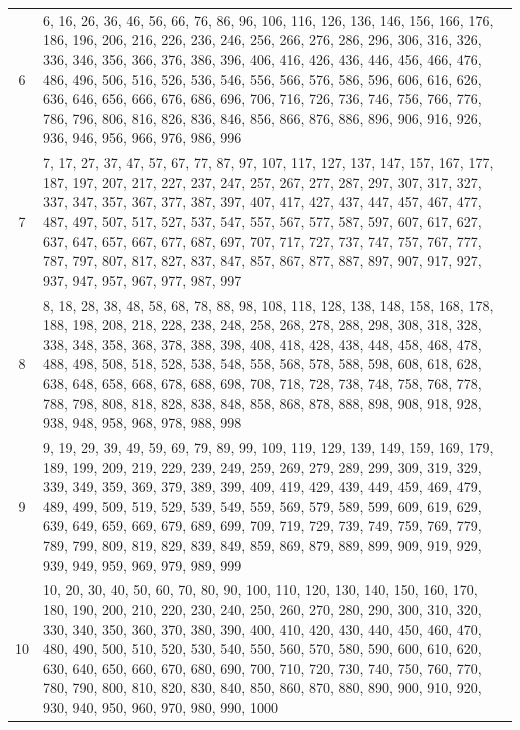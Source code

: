 \documentclass[a4paper, 12pt]{book}
\begin{document}
\begin{appendices}
\begin{table}
\begin{center}
\begin{tabulary}{1.0\textwidth}{C p{11.80cm}}
      6 & 6, 16, 26, 36, 46, 56, 66, 76, 86, 96, 106, 116, 126, 136, 146, 156, 166, 176, 186, 196, 206, 216, 226, 236, 246, 256, 266, 276, 286, 296, 306, 316, 326, 336, 346, 356, 366, 376, 386, 396, 406, 416, 426, 436, 446, 456, 466, 476, 486, 496, 506, 516, 526, 536, 546, 556, 566, 576, 586, 596, 606, 616, 626, 636, 646, 656, 666, 676, 686, 696, 706, 716, 726, 736, 746, 756, 766, 776, 786, 796, 806, 816, 826, 836, 846, 856, 866, 876, 886, 896, 906, 916, 926, 936, 946, 956, 966, 976, 986, 996 \\
      7 & 7, 17, 27, 37, 47, 57, 67, 77, 87, 97, 107, 117, 127, 137, 147, 157, 167, 177, 187, 197, 207, 217, 227, 237, 247, 257, 267, 277, 287, 297, 307, 317, 327, 337, 347, 357, 367, 377, 387, 397, 407, 417, 427, 437, 447, 457, 467, 477, 487, 497, 507, 517, 527, 537, 547, 557, 567, 577, 587, 597, 607, 617, 627, 637, 647, 657, 667, 677, 687, 697, 707, 717, 727, 737, 747, 757, 767, 777, 787, 797, 807, 817, 827, 837, 847, 857, 867, 877, 887, 897, 907, 917, 927, 937, 947, 957, 967, 977, 987, 997 \\
      8 & 8, 18, 28, 38, 48, 58, 68, 78, 88, 98, 108, 118, 128, 138, 148, 158, 168, 178, 188, 198, 208, 218, 228, 238, 248, 258, 268, 278, 288, 298, 308, 318, 328, 338, 348, 358, 368, 378, 388, 398, 408, 418, 428, 438, 448, 458, 468, 478, 488, 498, 508, 518, 528, 538, 548, 558, 568, 578, 588, 598, 608, 618, 628, 638, 648, 658, 668, 678, 688, 698, 708, 718, 728, 738, 748, 758, 768, 778, 788, 798, 808, 818, 828, 838, 848, 858, 868, 878, 888, 898, 908, 918, 928, 938, 948, 958, 968, 978, 988, 998 \\
      9 & 9, 19, 29, 39, 49, 59, 69, 79, 89, 99, 109, 119, 129, 139, 149, 159, 169, 179, 189, 199, 209, 219, 229, 239, 249, 259, 269, 279, 289, 299, 309, 319, 329, 339, 349, 359, 369, 379, 389, 399, 409, 419, 429, 439, 449, 459, 469, 479, 489, 499, 509, 519, 529, 539, 549, 559, 569, 579, 589, 599, 609, 619, 629, 639, 649, 659, 669, 679, 689, 699, 709, 719, 729, 739, 749, 759, 769, 779, 789, 799, 809, 819, 829, 839, 849, 859, 869, 879, 889, 899, 909, 919, 929, 939, 949, 959, 969, 979, 989, 999 \\
      10 & 10, 20, 30, 40, 50, 60, 70, 80, 90, 100, 110, 120, 130, 140, 150, 160, 170, 180, 190, 200, 210, 220, 230, 240, 250, 260, 270, 280, 290, 300, 310, 320, 330, 340, 350, 360, 370, 380, 390, 400, 410, 420, 430, 440, 450, 460, 470, 480, 490, 500, 510, 520, 530, 540, 550, 560, 570, 580, 590, 600, 610, 620, 630, 640, 650, 660, 670, 680, 690, 700, 710, 720, 730, 740, 750, 760, 770, 780, 790, 800, 810, 820, 830, 840, 850, 860, 870, 880, 890, 900, 910, 920, 930, 940, 950, 960, 970, 980, 990, 1000 \\
    \end{tabulary}
  \end{center}


\end{table}
\end{appendices}
\end{document}
